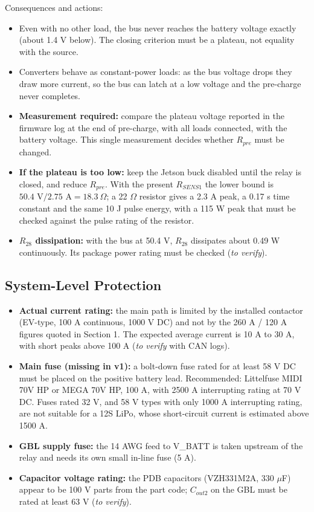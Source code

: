 \documentclass[11pt,a4paper]{article}
\begin{document}
Consequences and actions:
\begin{itemize}
    \item Even with no other load, the bus never reaches the battery voltage exactly (about 1.4 V below). The closing criterion must be a plateau, not equality with the source.
    \item Converters behave as constant-power loads: as the bus voltage drops they draw more current, so the bus can latch at a low voltage and the pre-charge never completes.
    \item \textbf{Measurement required:} compare the plateau voltage reported in the firmware log at the end of pre-charge, with all loads connected, with the battery voltage. This single measurement decides whether $R_{pre}$ must be changed.
    \item \textbf{If the plateau is too low:} keep the Jetson buck disabled until the relay is closed, and reduce $R_{pre}$. With the present $R_{SENS1}$ the lower bound is $50.4 \text{ V} / 2.75 \text{ A} = 18.3\ \Omega$; a 22 $\Omega$ resistor gives a 2.3 A peak, a 0.17 s time constant and the same 10 J pulse energy, with a 115 W peak that must be checked against the pulse rating of the resistor.
    \item \textbf{$R_{28}$ dissipation:} with the bus at 50.4 V, $R_{28}$ dissipates about 0.49 W continuously. Its package power rating must be checked (\textit{to verify}).
\end{itemize}

\subsection{System-Level Protection}

\begin{itemize}
    \item \textbf{Actual current rating:} the main path is limited by the installed contactor (EV-type, 100 A continuous, 1000 V DC) and not by the 260 A / 120 A figures quoted in Section 1. The expected average current is 10 A to 30 A, with short peaks above 100 A (\textit{to verify} with CAN logs).
    \item \textbf{Main fuse (missing in v1):} a bolt-down fuse rated for at least 58 V DC must be placed on the positive battery lead. Recommended: Littelfuse MIDI 70V HP or MEGA 70V HP, 100 A, with 2500 A interrupting rating at 70 V DC. Fuses rated 32 V, and 58 V types with only 1000 A interrupting rating, are not suitable for a 12S LiPo, whose short-circuit current is estimated above 1500 A.
    \item \textbf{GBL supply fuse:} the 14 AWG feed to V\_BATT is taken upstream of the relay and needs its own small in-line fuse (5 A).
    \item \textbf{Capacitor voltage rating:} the PDB capacitors (VZH331M2A, 330 $\mu$F) appear to be 100 V parts from the part code; $C_{out2}$ on the GBL must be rated at least 63 V (\textit{to verify}).
\end{itemize}
\end{document}

